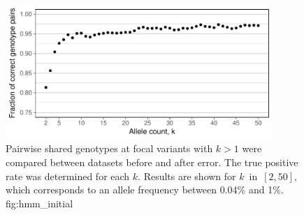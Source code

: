 

\begin{figure}[!htb]
\centering
\includegraphics[width=0.9\textwidth]{./img/ch4/hmm_initial}
{Pairwise shared genotypes at focal \fk{} variants with $k > 1$ were compared between datasets before and after error.
The true positive rate was determined for each $k$.
Results are shown for $k$~in~${[2,50]}$, which corresponds to an allele frequency between 0.04\% and 1\%.}
{fig:hmm_initial}
\end{figure}
